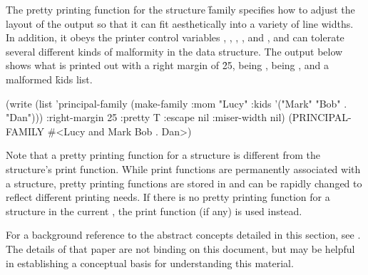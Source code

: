 The pretty printing function for the structure \f{family} specifies how to
adjust the layout of the output so that it can fit aesthetically into
a variety of line widths.  In addition, it obeys 
the printer control variables ,
, ,
,  and ,
and can tolerate several different kinds of malformity in the data structure.
The output below shows what is printed out with a right margin of \f{25},
 being ,  being ,
and a malformed \f{kids} list.
 
\code
 (write (list 'principal-family
              (make-family :mom "Lucy"
                           :kids '("Mark" "Bob" . "Dan")))
        :right-margin 25 :pretty T :escape nil :miser-width nil)
 (PRINCIPAL-FAMILY
  #<Lucy and
      Mark Bob . Dan>)
\endcode
  
Note that a pretty printing function for a structure is different from the
structure's print function.  While print functions are permanently
associated with a structure, pretty printing functions are stored in 
 and can be rapidly changed to reflect 
different printing needs.  If there is no pretty printing function for 
a structure in the current ,
the print function (if any) is used instead.

\endsubSection%


For a background reference to the abstract concepts detailed in this
section, see \XPPaper.  The details of that paper are not binding on
this document, but may be helpful in establishing a conceptual basis for
understanding this material.

\endsubsection%

